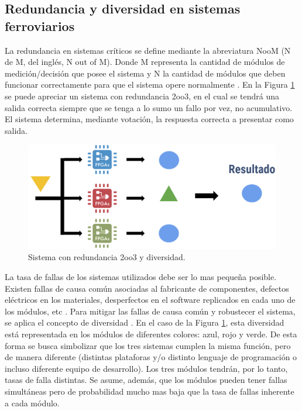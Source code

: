 \subsection{Redundancia y diversidad en sistemas ferroviarios}

	La redundancia en sistemas críticos se define mediante la abreviatura NooM (N de M, del inglés, N out of M). Donde M representa la cantidad de módulos de medición/decisión que posee el sistema y N la cantidad de módulos que deben funcionar correctamente para que el sistema opere normalmente \cite{Paper_12,Paper_41,Paper_47,Paper_78,Paper_80,Paper_82,Paper_84}. En la Figura \ref{fig:redundancia} se puede apreciar un sistema con redundancia 2oo3, en el cual se tendrá una salida correcta siempre que se tenga a lo sumo un fallo por vez, no acumulativo. El sistema determina, mediante votación, la respuesta correcta a presentar como salida.
	
	\begin{figure}[h]
		\centering
		\includegraphics[width=1\textwidth]{Figuras/redundancia.png}
		\centering\caption{Sistema con redundancia 2oo3 y diversidad.}
		\label{fig:redundancia}
	\end{figure}
	
	La tasa de fallas de los sistemas utilizados debe ser lo mas pequeña posible. Existen fallas de causa común asociadas al fabricante de componentes, defectos eléctricos en los materiales, desperfectos en el software replicados en cada uno de los módulos, etc \cite{Paper_30,Paper_32,Paper_42,Paper_47,Paper_77,Paper_83,Paper_84,Paper_118,Paper_122,Paper_124,Paper_125,Paper_127,Paper_131,Paper_132,Paper_136,Paper_138,Paper_140}. Para mitigar las fallas de causa común y robustecer el sistema, se aplica el concepto de diversidad \cite{Paper_53,Paper_125,Paper_131,Paper_132,Paper_140,Paper_171}. En el caso de la Figura \ref{fig:redundancia}, esta diversidad está representada en los módulos de diferentes colores: azul, rojo y verde. De esta forma se busca simbolizar que los tres sistemas cumplen la misma función, pero de manera diferente (distintas plataforas y/o distinto lenguaje de programación o incluso diferente equipo de desarrollo). Los tres módulos tendrán, por lo tanto, tasas de falla distintas. Se asume, además, que los módulos pueden tener fallas simultáneas pero de probabilidad mucho mas baja que la tasa de fallas inherente a cada módulo.
	
